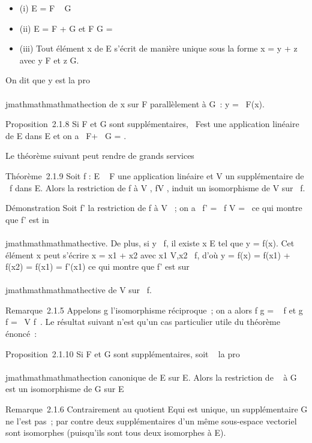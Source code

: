 \begin{itemize}
\itemsep1pt\parskip0pt
\item
  (i) E = F \oplus~ G
\item
  (ii) E = F + G et F \bigcap G = \0\
\item
  (iii) Tout élément x de E s'écrit de manière unique sous la forme x =
  y + z avec y \in F et z \in G.
\end{itemize}

On dit que y est la pro\\\\jmathmathmathmathection de x sur F parallèlement à G~: y =
\pi~F\parallelG(x).

Proposition~2.1.8 Si F et G sont supplémentaires, \pi~F\parallelG est une
application linéaire de E dans E et on a \pi~F\parallelG + \pi~G\parallelF
= \mathrmIdE.

Le théorème suivant peut rendre de grands services

Théorème~2.1.9 Soit f : E \rightarrow~ F une application linéaire et V un
supplémentaire de
\mathrmKer~f dans E. Alors
la restriction de f à V , f\textbar{}V , induit un
isomorphisme de V sur
\mathrmIm~f.

Démonstration Soit f' la restriction de f à V ~; on a
\mathrmKer~f'
= \mathrmKer~f \bigcap V =
\0\ ce qui montre que f' est
in\\\\jmathmathmathmathective. De plus, si y
\in\mathrmIm~f, il existe x \in
E tel que y = f(x). Cet élément x peut s'écrire x = x1 +
x2 avec x1 \in V,x2
\in\mathrmKer~f, d'où y = f(x)
= f(x1) + f(x2) = f(x1) = f'(x1)
ce qui montre que f' est sur\\\\jmathmathmathmathective de V sur
\mathrmIm~f.

Remarque~2.1.5 Appelons g l'isomorphisme réciproque~; on a alors f \cdot g
=
\mathrmId\mathrmIm~
f et g \cdot f = \pi~V
\parallel\mathrmKer f~. Le
résultat suivant n'est qu'un cas particulier utile du théorème énoncé~:

Proposition~2.1.10 Si F et G sont supplémentaires, soit \pi~ la pro\\\\jmathmathmathmathection
canonique de E sur E\diagupF. Alors la restriction de \pi~ à G est un
isomorphisme de G sur E\diagupF

Remarque~2.1.6 Contrairement au quotient E\diagupF qui est unique, un
supplémentaire G ne l'est pas~; par contre deux supplémentaires d'un
même sous-espace vectoriel sont isomorphes (puisqu'ils sont tous deux
isomorphes à E\diagupF).

